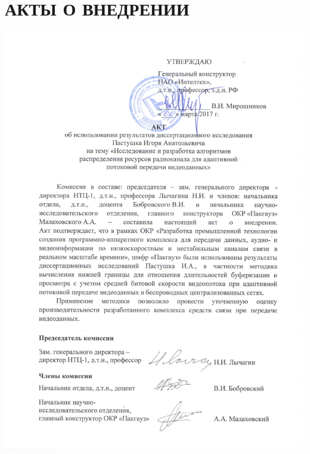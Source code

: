 \chapter{АКТЫ О ВНЕДРЕНИИ}
\label{AppD}
\begin{center}
\includegraphics[width=1\textwidth,height=0.8\textheight]{appendix/Inteltech.pdf}
\end{center}
%

